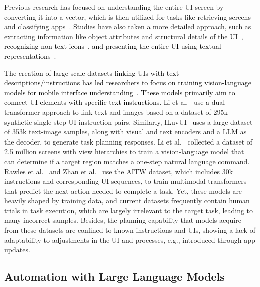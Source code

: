 Previous research has focused on understanding the entire UI screen by converting it into a vector, which is then utilized for tasks like retrieving screens and classifying apps~\cite{li2021screen2vec,Fu2021UnderstandingMG,ang2022learning}. Studies have also taken a more detailed approach, such as extracting information like object attributes and structural details of the UI~\cite{zhang2021screen,wu2021screen,li-etal-2020-widget,xie2022psychologically}, \textcolor{black}{recognizing non-text icons~\cite{chen2020object,chen2022towards,he2021actionbert}, and presenting the entire UI using textual representations~\cite{wang2021screen2words,leiva2022describing,baechler2024screenai}. }

\textcolor{black}{The creation of large-scale datasets linking UIs with text descriptions/instructions has led researchers to focus on training vision-language models for mobile interface understanding~\cite{li2020mapping,sun2022meta,burns2022dataset,venkatesh2022ugif,rawles2023androidinthewild}. These models primarily aim to connect UI elements with specific text instructions.} Li et al.~\cite{li2020mapping} use a dual-transformer approach to link text and images based on a dataset of 295k synthetic single-step UI-instruction pairs. Similarly, ILuvUI~\cite{jiang2023iluvui} uses a large dataset of 353k text-image samples, along with visual and text encoders and a LLM as the decoder, to generate task planning responses. Li et al.~\cite{li2023spotlight} collected a dataset of 2.5 million screens with view hierarchies to train a vision-language model that can determine if a target region matches a one-step natural language command. Rawles et al.~\cite{rawles2023androidinthewild} and Zhan et al.~\cite{zhan2023you} use the AITW dataset, which includes 30k instructions and corresponding UI sequences, to train multimodal transformers that predict the next action needed to complete a task. Yet, these models are heavily shaped by training data, and current datasets frequently contain human trials in task execution, which are largely irrelevant to the target task, leading to many incorrect samples. Besides, the planning capability that models acquire from these datasets are confined to known instructions and UIs, showing a lack of adaptability to adjustments in the UI and processes, e.g., introduced through app updates.

\subsection{Automation with Large Language Models}

